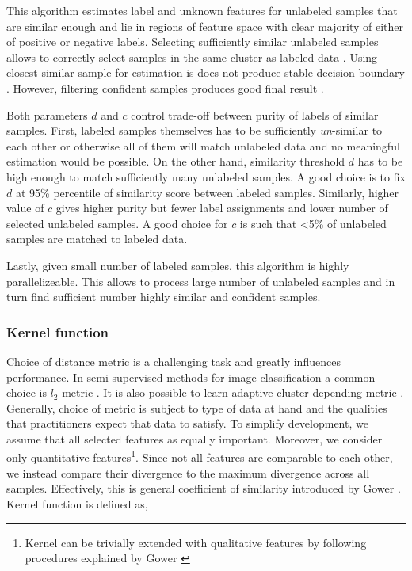 \documentclass{article}
\begin{document}
This algorithm estimates label and unknown features for unlabeled samples that are similar enough and lie in regions of feature space with clear majority of either of positive or negative labels. Selecting sufficiently similar unlabeled samples allows to correctly select samples in the same cluster as labeled data . Using closest similar sample for estimation is does not produce stable decision boundary . However, filtering confident samples  produces good final result .

Both parameters $d$ and $c$ control trade-off between purity of labels of similar samples. First, labeled samples themselves has to be sufficiently \textit{un}-similar to each other or otherwise all of them will match unlabeled data and no meaningful estimation would be possible. On the other hand, similarity threshold $d$ has to be high enough to match sufficiently many unlabeled samples. A good choice is to fix $d$ at 95\% percentile of similarity score between labeled samples. Similarly, higher value of $c$ gives higher purity but fewer label assignments and lower number of selected unlabeled samples. A good choice for $c$ is such that <5\% of unlabeled samples are matched to labeled data.

Lastly, given small number of labeled samples, this algorithm is highly parallelizeable. This allows to process large number of unlabeled samples and in turn find sufficient number highly similar and confident samples.

\subsubsection{Kernel function}

Choice of distance metric is a challenging task and greatly influences performance. In semi-supervised methods for image classification a common choice is $l_2$ metric \cite{semi-cluster, semi-adversarial}. It is also possible to  learn adaptive cluster depending metric \cite{semi-fuzzy}. Generally, choice of metric is subject to type of data at hand and the qualities that practitioners expect that data to satisfy. To simplify development, we assume that all selected features as equally important. Moreover, we consider only quantitative features\footnote{Kernel can be trivially extended with qualitative features by following procedures explained by Gower \cite{gower}}. Since not all features are comparable to each other, we instead compare their divergence to the maximum divergence across all samples. Effectively, this is general coefficient of similarity introduced by Gower \cite{gower}. Kernel function is defined as,
\end{document}

